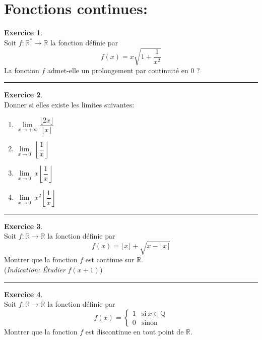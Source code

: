\documentclass[a4paper,10pt]{article}
\theoremstyle{definition}
\theoremstyle{definition}
\newtheorem{exo}{Exercice}
\newcommand{\R}{\mathbb{R}}
\newcommand{\Q}{\mathbb{Q}}
\begin{document}
\section*{Fonctions continues:}
\begin{minipage}{1\linewidth}
\begin{minipage}[t]{0.48\linewidth}
\raggedright
\begin{exo}\quad\\
Soit $f: \R^*\rightarrow\R$ la fonction définie par $$f(x) = x\sqrt{1+\dfrac{1}{x^2}}$$
La fonction $f$ admet-elle un prolongement par continuité en $0$ ? 

\centering
\rule{1\linewidth}{0.6pt}
\end{exo}

\begin{exo}\quad\\
Donner si elles existe les limites suivantes:
\begin{multicols}{2}
\begin{enumerate}
\item $\lim\limits_{x\rightarrow+\infty} \dfrac{\lfloor 2x\rfloor}{\lfloor x\rfloor}$
\item $\lim\limits_{x\rightarrow 0}~ \left\lfloor\dfrac{ 1}{ x} \right\rfloor$
\item $\lim\limits_{x\rightarrow 0} ~x\left\lfloor\dfrac{ 1}{ x} \right\rfloor$
\item$\lim\limits_{x\rightarrow 0} ~x^2\left\lfloor\dfrac{ 1}{ x} \right\rfloor$
\end{enumerate}
\end{multicols}
\centering\rule{1\linewidth}{0.6pt}
\end{exo}

\begin{exo}\quad\\
Soit $f: \R\rightarrow\R$ la fonction définie par $$f(x) =\lfloor x\rfloor + \sqrt{x - \lfloor x\rfloor }$$
Montrer que la fonction $f$ est continue sur $\R$.\\
(\textit{Indication: Étudier }$f(x+1)$)

\centering
\rule{1\linewidth}{0.6pt}
\end{exo}

\end{minipage}	
\hfill\vrule\hfill
\begin{minipage}[t]{0.48\linewidth}
\raggedright

\begin{exo}\quad\\
Soit $f: \R\rightarrow\R$ la fonction définie par 
$$f(x) =\left\{\begin{array}{cl}
1 & \text{si} \  x \in\Q\\
0 & \text{sinon} 
\end{array}\right.$$
Montrer que la fonction $f$ est discontinue en tout point de $\R$.\\


\end{exo}
\end{minipage}
\end{minipage}
\end{document}
